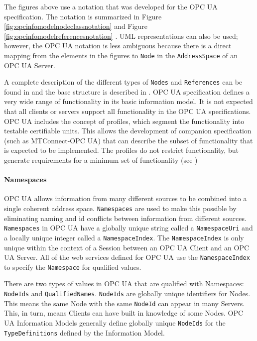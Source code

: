 
\FloatBarrier

The figures above use a notation that was developed for the OPC UA specification. The notation is summarized in Figure \ref{fig:opcinfomodelnodeclassnotation} and Figure \ref{fig:opcinfomodelreferencesnotation} . UML representations can also be used; however, the OPC UA notation is less ambiguous because there is a direct mapping from the elements in the figures to \texttt{Node} in the \texttt{AddressSpace} of an OPC UA Server.


\FloatBarrier

\FloatBarrier

A complete description of the different types of \texttt{Nodes} and \texttt{References} can be found in \cite{UAPart3} and the base structure is described in \cite{UAPart5}.
OPC UA specification defines a very wide range of functionality in its basic information model. It is not expected that all clients or servers support all functionality in the OPC UA specifications. OPC UA includes the concept of profiles, which segment the functionality into testable certifiable units. This allows the development of companion specification (such as MTConnect-OPC UA) that can describe the subset of functionality that is expected to be implemented. The profiles do not restrict functionality, but generate requirements for a minimum set of functionality (see \cite{UAPart7})


\paragraph{Namespaces}

OPC UA allows information from many different sources to be combined into a single coherent address space. \texttt{Namespaces} are used to make this possible by eliminating naming and id conflicts between information from different sources. \texttt{Namespaces} in OPC UA have a globally unique string called a \texttt{NamespaceUri} and a locally unique integer called a \texttt{NamespaceIndex}. The \texttt{NamespaceIndex} is only unique within the context of a Session between an OPC UA Client and an OPC UA Server. All of the web services defined for OPC UA use the \texttt{NamespaceIndex} to specify the \texttt{Namespace} for qualified values.

There are two types of values in OPC UA that are qualified with Namespaces: \texttt{NodeIds} and \texttt{QualifiedNames}. \texttt{NodeIds} are globally unique identifiers for Nodes. This means the same Node with the same \texttt{NodeId} can appear in many Servers. This, in turn, means Clients can have built in knowledge of some Nodes. OPC UA Information Models generally define globally unique \texttt{NodeIds} for the \texttt{TypeDefinitions} defined by the Information Model.

